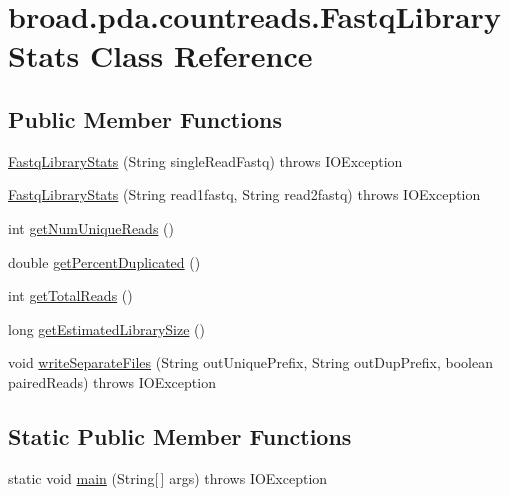 \hypertarget{classbroad_1_1pda_1_1countreads_1_1_fastq_library_stats}{\section{broad.\+pda.\+countreads.\+Fastq\+Library\+Stats Class Reference}
\label{classbroad_1_1pda_1_1countreads_1_1_fastq_library_stats}
}
\subsection*{Public Member Functions}
\begin{DoxyCompactItemize}
\item 
\hyperlink{classbroad_1_1pda_1_1countreads_1_1_fastq_library_stats_ab038e21f9033309ec215c7c7f5a03ae1}{Fastq\+Library\+Stats} (String single\+Read\+Fastq)  throws I\+O\+Exception 
\item 
\hyperlink{classbroad_1_1pda_1_1countreads_1_1_fastq_library_stats_ad29ca0b6d3839c197fcea4555621fda4}{Fastq\+Library\+Stats} (String read1fastq, String read2fastq)  throws I\+O\+Exception 
\item 
int \hyperlink{classbroad_1_1pda_1_1countreads_1_1_fastq_library_stats_a3d80a8886d5085a020400bbb2401acfd}{get\+Num\+Unique\+Reads} ()
\item 
double \hyperlink{classbroad_1_1pda_1_1countreads_1_1_fastq_library_stats_a6d681ea21ea795c5c29e87eaa1a3152a}{get\+Percent\+Duplicated} ()
\item 
int \hyperlink{classbroad_1_1pda_1_1countreads_1_1_fastq_library_stats_a927c0809077c9d8be5623e836a9f0179}{get\+Total\+Reads} ()
\item 
long \hyperlink{classbroad_1_1pda_1_1countreads_1_1_fastq_library_stats_af0d4416c9e3a72bfc2ab99d44b2b0ab9}{get\+Estimated\+Library\+Size} ()
\item 
void \hyperlink{classbroad_1_1pda_1_1countreads_1_1_fastq_library_stats_a58c27aacaf77599b4b0c413f32dd61d5}{write\+Separate\+Files} (String out\+Unique\+Prefix, String out\+Dup\+Prefix, boolean paired\+Reads)  throws I\+O\+Exception 
\end{DoxyCompactItemize}
\subsection*{Static Public Member Functions}
\begin{DoxyCompactItemize}
\item 
static void \hyperlink{classbroad_1_1pda_1_1countreads_1_1_fastq_library_stats_aeb8b21c540228a98bd7a41bba2a8ec99}{main} (String\mbox{[}$\,$\mbox{]} args)  throws I\+O\+Exception 
\end{DoxyCompactItemize}


